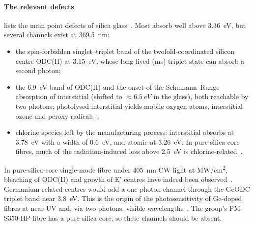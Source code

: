 \paragraph{The relevant defects}  lists the main point defects of silica
glass~\cite{Skuja1998,Griscom1991,Skuja2005,Skuja2012,Girard2019}. Most absorb well above
\SI{3.36}{eV}, but several channels exist at \SI{369.5}{nm}:
\begin{itemize}
  \item the spin-forbidden singlet--triplet band of the twofold-coordinated silicon centre ODC(II) at
        \SI{3.15}{eV}, whose long-lived (\si{ms}) triplet state can absorb a second photon;
  \item the \SI{6.9}{eV} band of ODC(II) and the onset of the Schumann--Runge absorption of interstitial
        \Oxy{} (shifted to $\approx\SI{6.5}{eV}$ in the glass), both reachable by two photons;
        photolysed interstitial \Oxy{} yields mobile oxygen atoms, interstitial ozone and peroxy
        radicals~\cite{Awazu1990,Kajihara2004a,Kajihara2005a,Skuja2000};
  \item chlorine species left by the manufacturing process: interstitial  absorbs at
        \SI{3.78}{eV} with a width of \SI{0.6}{eV}, and atomic  at \SI{3.26}{eV}. In pure-silica-core
        fibres, much of the radiation-induced loss above \SI{2.5}{eV} is chlorine-related~\cite{Skuja2017,Girard2019}.
\end{itemize}
In pure-silica-core single-mode fibre under \SI{405}{nm} CW light at \si{MW/cm^2}, bleaching of ODC(II) and
growth of E$'$ centres have indeed been observed~\cite{Gonschior2013JNCS}. Germanium-related centres
would add a one-photon channel through the GeODC triplet band near \SI{3.8}{eV}. This is the origin of
the photosensitivity of Ge-doped fibres at near-UV and, via two photons, visible
wavelengths~\cite{Hill1978,Starodubov1997,Grubsky1999}. The group's PM-S350-HP fibre has a pure-silica core, so these
channels should be absent.

